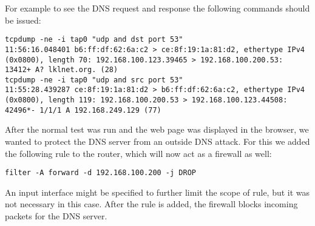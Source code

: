 For example to see the DNS request and response the following commands should be issued:
\lstset{language=zsh, caption=DNS request and respons, label=lst:dnsrr}
\begin{lstlisting}
tcpdump -ne -i tap0 "udp and dst port 53"
11:56:16.048401 b6:ff:df:62:6a:c2 > ce:8f:19:1a:81:d2, ethertype IPv4 (0x0800), length 70: 192.168.100.123.39465 > 192.168.100.200.53: 13412+ A? lklnet.org. (28)
tcpdump -ne -i tap0 "udp and src port 53"
11:55:28.439287 ce:8f:19:1a:81:d2 > b6:ff:df:62:6a:c2, ethertype IPv4 (0x0800), length 119: 192.168.100.200.53 > 192.168.100.123.44508: 42496*- 1/1/1 A 192.168.249.129 (77)
\end{lstlisting}


After the normal test was run and the web page was displayed in the browser, we wanted to protect the DNS server from 
an outside DNS attack. For this we added the following rule to the router, which will now act as a firewall as well:
\lstset{language=zsh, caption=, label=complex-firewall}
\begin{lstlisting}
filter -A forward -d 192.168.100.200 -j DROP
\end{lstlisting}
An input interface might be specified to further limit the scope of rule, but it was not necessary in this case.
After the rule is added, the firewall blocks incoming packets for the DNS server.
